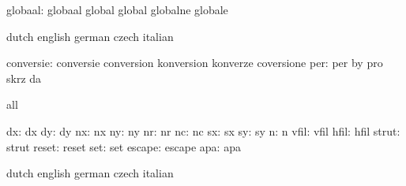                   globaal: globaal                   global
                           global                    globalne
                           globale

\stopconstants





\startvariables            dutch                     english
                           german                    czech
                           italian

                conversie: conversie                 conversion
                           konversion                konverze
                           coversione
                      per: per                       by
                           pro                       skrz
                           da

\stopvariables




\startconstants            all

                       dx: dx
                       dy: dy
                       nx: nx
                       ny: ny
                       nr: nr
                       nc: nc
                       sx: sx
                       sy: sy
                        n: n
                     vfil: vfil
                     hfil: hfil
                    strut: strut
                    reset: reset
                      set: set
                   escape: escape
                      apa: apa

\stopconstants




\startvariables            dutch                     english
                           german                    czech
                           italian

